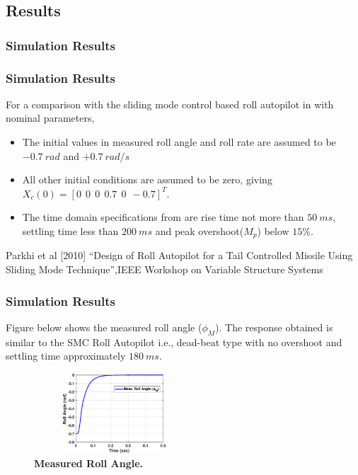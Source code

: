 \documentclass[10pt]{beamer}
\begin{document}
\subsection{Results}
\frametitle{Simulation Results}
\begin{frame}
\frametitle{Simulation Results}
For a comparison with the sliding mode control based roll autopilot in \cite{parkhi2010} with nominal parameters,
\begin{itemize}
\item The initial values in measured roll angle and roll rate are assumed to be $-0.7~rad$ and $+0.7~rad/s$
\item All other initial conditions are assumed to be zero, giving $X_c(0)=[0~~0~~0~~0.7~~0~~-0.7]^T$.
\item The time domain specifications from \cite{parkhi2010} are rise time not more than $50~ms$, settling time less than $200~ms$ and peak overshoot($M_p$) below $15$\%.
\end{itemize}
\vspace{.5cm}
\footnoterule
\tiny {\cite{parkhi2010} Parkhi et al [2010] ``Design of Roll Autopilot for a Tail Controlled Missile Using Sliding Mode Technique'',IEEE Workshop on Variable Structure Systems}
\end{frame}
\begin{frame}
\frametitle{Simulation Results}
Figure below shows the measured roll angle ($\phi_M$). The response obtained is similar to the SMC Roll Autopilot i.e., dead-beat type with no overshoot and settling time approximately $180~ms$.
\begin{figure}[!h]
\begin{center}
\includegraphics[width=6cm,height=3.0cm]{CascRollAP61.eps}
\vspace{-0.2cm}
\caption{\bf{Measured Roll Angle.}} \label{rollAP13}
\end{center}
\vspace{-0.5cm}
\end{figure}

\end{frame}
\end{document}
